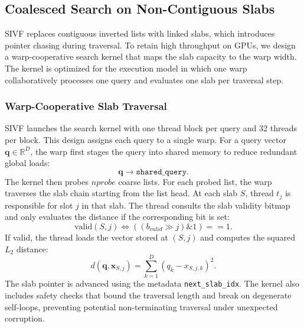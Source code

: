 \documentclass[sigconf,anonymous]{acmart}
\theoremstyle{plain}
\theoremstyle{definition}
\theoremstyle{remark}
\begin{document}
\subsection{Coalesced Search on Non-Contiguous Slabs}
\label{sec:methods_search_kernel}

SIVF replaces contiguous inverted lists with linked slabs, which introduces pointer chasing during traversal. To retain high throughput on GPUs, we design a warp-cooperative search kernel that maps the slab capacity to the warp width. The kernel is optimized for the execution model in which one warp collaboratively processes one query and evaluates one slab per traversal step.

\subsubsection{Warp-Cooperative Slab Traversal}

SIVF launches the search kernel with one thread block per query and 32 threads per block. This design assigns each query to a single warp. For a query vector $\mathbf{q} \in \mathbb{R}^D$, the warp first stages the query into shared memory to reduce redundant global loads:
\[
\mathbf{q} \rightarrow \texttt{shared\_query}.
\]
The kernel then probes $nprobe$ coarse lists. For each probed list, the warp traverses the slab chain starting from the list head. At each slab $S$, thread $t_j$ is responsible for slot $j$ in that slab. The thread consults the slab validity bitmap and only evaluates the distance if the corresponding bit is set:
\begin{equation}
\label{eq:slot_valid}
\text{valid}(S,j) \Leftrightarrow \left( (b_{valid} \gg j) \mathbin{\&} 1 \right) == 1.
\end{equation}
If valid, the thread loads the vector stored at $(S,j)$ and computes the squared $L_2$ distance:
\begin{equation}
\label{eq:l2}
d(\mathbf{q}, \mathbf{x}_{S,j}) = \sum_{k=1}^{D} (q_k - x_{S,j,k})^2.
\end{equation}
The slab pointer is advanced using the metadata \texttt{next\_slab\_idx}. The kernel also includes safety checks that bound the traversal length and break on degenerate self-loops, preventing potential non-terminating traversal under unexpected corruption.

\end{document}
